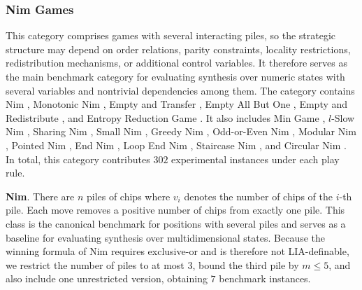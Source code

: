 \documentclass[review]{elsarticle}
\newcommand{\set}[1]{\{ #1 \}}
\newcommand{\tuple}[1]{\langle {#1} \rangle}
\newcommand{\true}{\top}
\newcommand{\statevar}{\mathcal{X}}
\newcommand{\act}{\mathcal{A}}
\newcommand{\constraint}{\mathcal{C}}
\newcommand{\estate}{\mathcal{E}}
\newcommand{\pre}{\mathtt{pre}}
\newcommand{\eff}{\mathtt{eff}}
\begin{document}
\subsubsection{Nim Games}
This category comprises games with several interacting piles, so the strategic structure may depend on order relations, parity constraints, locality restrictions, redistribution mechanisms, or additional control variables.
It therefore serves as the main benchmark category for evaluating synthesis over numeric states with several variables and nontrivial dependencies among them.
The category contains Nim \cite{Bou1901}, Monotonic Nim \cite{AhnCCEFGGKMPS2017}, Empty and Transfer \cite{Fer1998}, Empty All But One \cite{Fer1998}, Empty and Redistribute \cite{Fer1998}, and Entropy Reduction Game \cite{Fer1998}.
It also includes Min Game \cite{CaiH2010}, $l$-Slow Nim \cite{AhnCCEFGGKMPS2017}, Sharing Nim \cite{Ho2016}, Small Nim \cite{BerCG2001}, Greedy Nim \cite{AlbN2004}, Odd-or-Even Nim \cite{SmiS2002}, Modular Nim \cite{GavS2004}, Pointed Nim \cite{AlbN2004}, End Nim \cite{AlbN2001}, Loop End Nim \cite{AlbN2001}, Staircase Nim \cite{Spr1937}, and Circular Nim \cite{DufH2013}.
In total, this category contributes $302$ experimental instances under each play rule.

\textbf{Nim}. There are $n$ piles of chips where $v_i$ denotes the number of chips of the $i$-th pile.
Each move removes a positive number of chips from exactly one pile.
This class is the canonical benchmark for positions with several piles and serves as a baseline for evaluating synthesis over multidimensional states.
Because the winning formula of Nim requires exclusive-or and is therefore not LIA-definable, we restrict the number of piles to at most $3$, bound the third pile by $m \le 5$, and also include one unrestricted version, obtaining $7$ benchmark instances.
\end{document}
